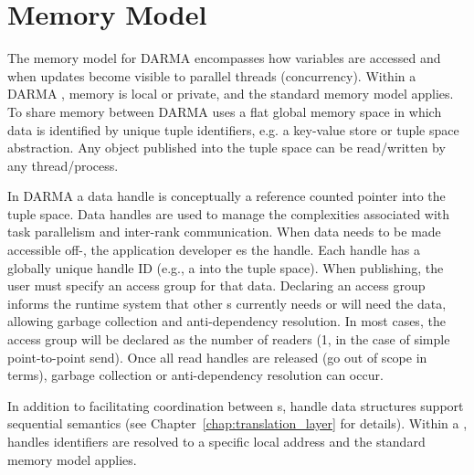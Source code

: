 
\section{Memory Model}
\label{sec:mem_model}
The memory model for \gls{DARMA} encompasses how variables are accessed %
  and when updates become visible to parallel threads (concurrency).  
Within a \gls{DARMA} , memory is local or private, and the
standard \CC{} memory model applies. 
To share memory between  \gls{DARMA} uses a flat global memory space in
which data is identified by unique \gls{tuple} identifiers, e.g. a \gls{key-value
  store} or \gls{tuple space} abstraction.  
Any object published into the \gls{tuple space} can be read/written by any thread/process. 

In \gls{DARMA} a data \gls{handle} is conceptually a \gls{reference counted pointer} into the
\gls{tuple space}.  Data \glspl{handle} are used to manage the
complexities associated with \gls{task parallelism} and inter-\gls{rank} communication.  
When data needs to be made accessible off-, the application developer 
es the \gls{handle}.  Each \gls{handle} has a globally unique handle ID
(e.g., a  into the \gls{tuple space}).  
When publishing, the user must specify an \gls{access group} for that data.  
Declaring an \gls{access group} informs the \gls{runtime system} that other
s currently needs or will need the data,  
allowing garbage collection and \gls{anti-dependency} resolution.
In most cases, the \gls{access group} will be declared as the number of readers (1, in the case of simple point-to-point send).
Once all read \glspl{handle} are released (go out of scope in \CC{} terms),
\gls{garbage collection} or \gls{anti-dependency} resolution can occur.


In addition to facilitating coordination between s, \gls{handle} data structures 
support \gls{sequential semantics} (see Chapter~\ref{chap:translation_layer} for details).
Within a ,  \glspl{handle} identifiers are resolved to a
specific local address and the standard \CC{} memory model applies.

